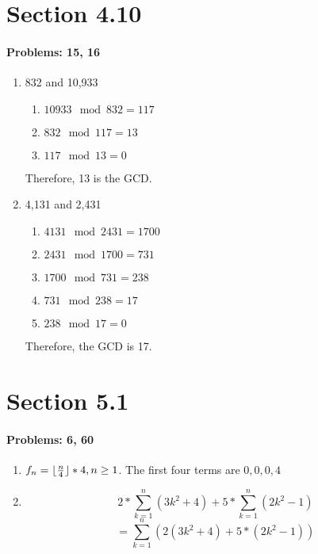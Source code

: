 \documentclass{article}
\makeatletter
\DeclarePairedDelimiter{\floor}{\lfloor}{\rfloor}
\newcommand\setItemnumber[1]{\setcounter{enum\romannumeral\@enumdepth}{\numexpr#1-1\relax}}
\makeatother
\begin{document}
\section{Section 4.10}
\paragraph{Problems: 15, 16}
\begin{enumerate}
    \setItemnumber{15}
    \item 832 and 10,933
    \begin{enumerate}
        \item $10933\mod832 = 117$
        \item $832\mod117 = 13$
        \item $117\mod13 = 0$
    \end{enumerate}
    Therefore, 13 is the GCD. 
    \item 4,131 and 2,431
    \begin{enumerate}
        \item $4131\mod2431 = 1700$
        \item $2431\mod1700 = 731$
        \item $1700\mod731 = 238$
        \item $731\mod238=17$
        \item $238\mod17=0$
    \end{enumerate}
    Therefore, the GCD is 17.
\end{enumerate}
\section{Section 5.1}
\paragraph{Problems: 6, 60}
\begin{enumerate}
    \setItemnumber{6}
    \item $f_n=\floor{\frac{n}{4}}*4, n\geq1$. The first four terms are $0,0,0,4$
    \setItemnumber{60}
    \item \begin{equation}
        2*\sum_{k=1}^n (3k^2+4) + 5*\sum_{k=1}^n(2k^2-1)
        \end{equation}
        \begin{equation}
        = \sum_{k=1}^n (2(3k^2+4) + 5*(2k^2-1))
    \end{equation}
\end{enumerate}
\end{document}

